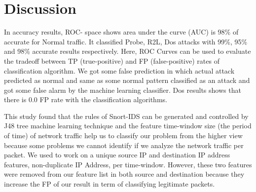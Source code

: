 \section{Discussion}
\label{discussion}

In accuracy results, ROC- space shows area under the curve (AUC) is 98\% of accurate for Normal traffic. It classified Probe, R2L, Dos attacks with 99\%, 95\% and 98\% accurate results respectively. Here, ROC Curves can be used to evaluate the tradeoff between TP (true-positive) and FP (false-positive) rates of classification algorithm. We got some false prediction in which actual attack predicted as normal and same as some normal pattern classified as an attack and got some false alarm by the machine learning classifier. Dos results shows that there is 0.0 FP rate with the classification algorithms.

This study found that the rules of Snort-IDS can be generated and controlled by J48 tree machine learning technique and the feature time-window size (the period of time) of network traffic help us to classify our problem from the higher view because some problems we cannot identify if we analyze the network traffic per packet. We used to work on a unique source IP and destination IP address features, non-duplicate IP Address, per time-window. However, these two features were removed from our feature list in both source and destination because they increase the FP of our result in term of classifying legitimate packets.
